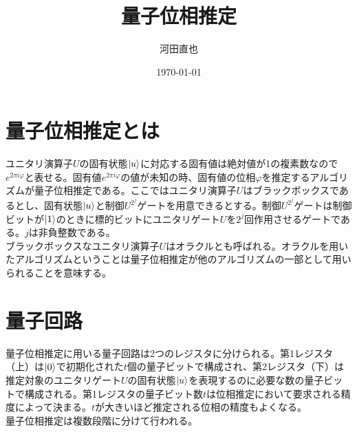 \documentclass[dvipdfmx]{jsarticle}
\title{\vspace{-2cm}量子位相推定}
\author{河田直也}
\date{\today}
\begin{document}
\maketitle
\section{量子位相推定とは}
ユニタリ演算子$U$の固有状態$\ket{u}$に対応する固有値は絶対値が1の複素数なので$e^{2\pi i \varphi}$と表せる。固有値$e^{2\pi i \varphi}$の値が未知の時、固有値の位相$\varphi$を推定するアルゴリズムが量子位相推定である。ここではユニタリ演算子$U$はブラックボックスであるとし、固有状態$\ket{u}$と制御$U^{2^j}$ゲートを用意できるとする。制御$U^{2^j}$ゲートは制御ビットが$\ket{1}$のときに標的ビットにユニタリゲート$U$を$2^j$回作用させるゲートである。$j$は非負整数である。\\
ブラックボックスなユニタリ演算子$U$はオラクルとも呼ばれる。オラクルを用いたアルゴリズムということは量子位相推定が他のアルゴリズムの一部として用いられることを意味する。
\vspace{3mm}
\section{量子回路}
量子位相推定に用いる量子回路は2つのレジスタに分けられる。第1レジスタ（上）は$\ket{0}$で初期化された$t$個の量子ビットで構成され、第2レジスタ（下）は推定対象のユニタリゲート$U$の固有状態$\ket{u}$を表現するのに必要な数の量子ビットで構成される。第1レジスタの量子ビット数$t$は位相推定において要求される精度によって決まる。$t$が大きいほど推定される位相の精度もよくなる。\\
量子位相推定は複数段階に分けて行われる。
\end{document}
